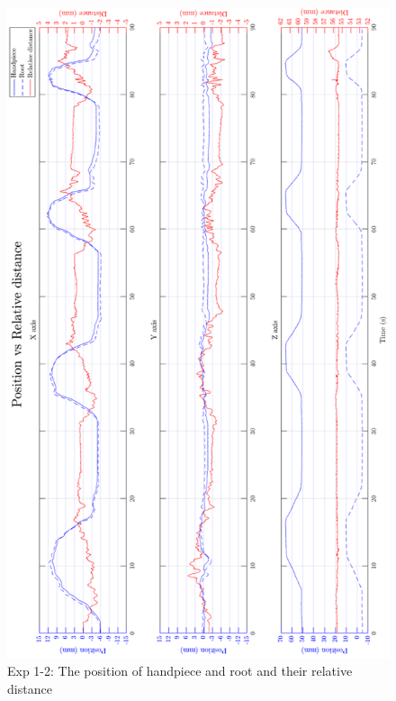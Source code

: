 \begin{figure}[htbp]
\begin{center}
\includegraphics[width=0.9\linewidth]{Images/exp/exp1_2_1.png}
\caption{Exp 1-2: The position of handpiece and root and their relative distance}
\label{fig: exp1_2_1}
\end{center}
\end{figure}	
			
